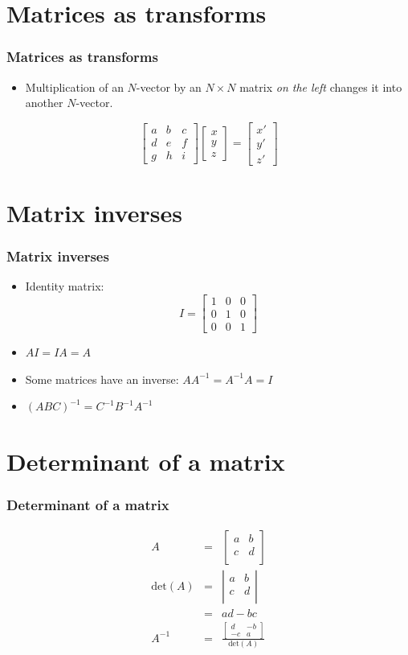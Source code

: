 \documentclass[]{beamer}
\newcommand{\sect}[1]{
\section{#1}
\begin{frame}[fragile]\frametitle{#1}
}
\begin{document}
\sect{Matrices as transforms}
\begin{itemize}
\item{Multiplication of an $N$-vector by an $N\times N$ matrix {\em on the
  left} changes it into another $N$-vector.}
\end{itemize}
\[
\left[\begin{array}{ccc}a&b&c\\d&e&f\\g&h&i\end{array}\right]
\left[\begin{array}{c}x\\y\\z\end{array}\right]
=
\left[\begin{array}{c}x'\\y'\\z'\end{array}\right]
\]
\end{frame}

\sect{Matrix inverses}
\begin{itemize}
\item Identity matrix: \[I=\left[\begin{array}{ccc}1&0&0\\0&1&0\\0&0&1\end{array}\right]\]
\item $AI = IA = A$
\item Some matrices have an inverse: $AA^{-1} = A^{-1}A = I$
\item $(ABC)^{-1} = C^{-1}B^{-1}A^{-1}$
\end{itemize}

\end{frame}

\sect{Determinant of a matrix}
\begin{eqnarray*}
A &=& \left[\begin{array}{cc}
a & b \\
c & d \\
\end{array}\right]\\
\mbox{det}(A) &=&  \left|\begin{array}{cc}
a & b \\
c & d \\
\end{array}\right|\\
&=& ad-bc\\
A^{-1} &=& \frac{\left[\begin{array}{cc}d&-b\\-c&a\end{array}\right]}{\mbox{det}(A)}
\end{eqnarray*}
\end{frame}
\end{document}
